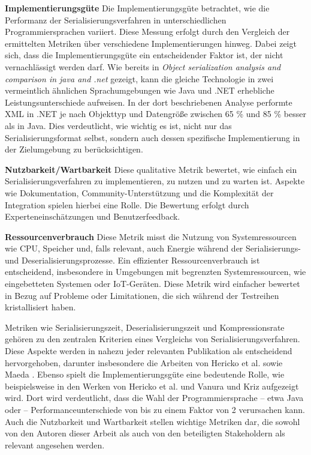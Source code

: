\documentclass[ngerman]{seminarvorlage}
\begin{document}
\textbf{Implementierungsgüte}\newline
Die Implementierungsgüte betrachtet, wie die Performanz der Serialisierungsverfahren in unterschiedlichen Programmiersprachen variiert. Diese Messung erfolgt durch den Vergleich der ermittelten Metriken über verschiedene Implementierungen hinweg. Dabei zeigt sich, dass die Implementierungsgüte ein entscheidender Faktor ist, der nicht vernachlässigt werden darf. Wie bereits in \textit{Object serialization analysis and comparison in java and .net} \cite{10.1145/944579.944589} gezeigt, kann die gleiche Technologie in zwei vermeintlich ähnlichen Sprachumgebungen wie Java und .NET erhebliche Leistungsunterschiede aufweisen. In der dort beschriebenen Analyse performte XML in .NET je nach Objekttyp und Datengröße zwischen 65 \% und 85 \% besser als in Java. Dies verdeutlicht, wie wichtig es ist, nicht nur das Serialisierungsformat selbst, sondern auch dessen spezifische Implementierung in der Zielumgebung zu berücksichtigen.

\textbf{Nutzbarkeit/Wartbarkeit}\newline
Diese qualitative Metrik bewertet, wie einfach ein Serialisierungsverfahren zu implementieren, zu nutzen und zu warten ist. Aspekte wie Dokumentation, Community-Unterstützung und die Komplexität der Integration spielen hierbei eine Rolle. Die Bewertung erfolgt durch Experteneinschätzungen und Benutzerfeedback.

\textbf{Ressourcenverbrauch}\newline
Diese Metrik misst die Nutzung von Systemressourcen wie CPU, Speicher und, falls relevant, auch Energie während der Serialisierungs- und Deserialisierungsprozesse. Ein effizienter Ressourcenverbrauch ist entscheidend, insbesondere in Umgebungen mit begrenzten Systemressourcen, wie eingebetteten Systemen oder IoT-Geräten. Diese Metrik wird einfacher bewertet in Bezug auf Probleme oder Limitationen, die sich während der Testreihen kristallisiert haben.

Metriken wie Serialisierungszeit, Deserialisierungszeit und Kompressionsrate gehören zu den zentralen Kriterien eines Vergleichs von Serialisierungsverfahren. Diese Aspekte werden in nahezu jeder relevanten Publikation als entscheidend hervorgehoben, darunter insbesondere die Arbeiten von Hericko et al. \cite{10.1145/944579.944589} sowie Maeda \cite{6215346}. Ebenso spielt die Implementierungsgüte eine bedeutende Rolle, wie beispielsweise in den Werken von Hericko et al. \cite{10.1145/944579.944589} und Vanura und Kriz \cite{vanura2018perfomance} aufgezeigt wird. Dort wird verdeutlicht, dass die Wahl der Programmiersprache – etwa Java oder  – Performanceunterschiede von bis zu einem Faktor von 2 verursachen kann. Auch die Nutzbarkeit und Wartbarkeit stellen wichtige Metriken dar, die sowohl von den Autoren dieser Arbeit als auch von den beteiligten Stakeholdern als relevant angesehen werden.
\end{document}
